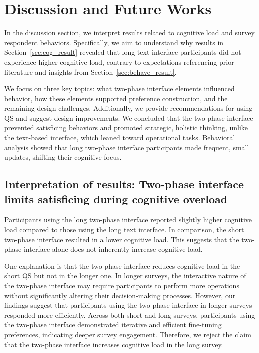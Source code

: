\section{Discussion and Future Works}
\label{sec:discussion}
In the discussion section, we interpret results related to cognitive load and survey respondent behaviors. Specifically, we aim to understand why results in Section~\ref{sec:cog_result} revealed that long text interface participants did not experience higher cognitive load, contrary to expectations referencing prior literature and insights from Section~\ref{sec:behave_result}.

We focus on three key topics: what two-phase interface elements influenced behavior, how these elements supported preference construction, and the remaining design challenges. Additionally, we provide recommendations for using QS and suggest design improvements. We concluded that the two-phase interface prevented satisficing behaviors and promoted strategic, holistic thinking, unlike the text-based interface, which leaned toward operational tasks. Behavioral analysis showed that long two-phase interface participants made frequent, small updates, shifting their cognitive focus.

\subsection{Interpretation of results: Two-phase interface limits satisficing during cognitive overload} \label{sec:satisficing}

Participants using the long two-phase interface reported slightly higher cognitive load compared to those using the long text interface. In comparison, the short two-phase interface resulted in a lower cognitive load. This suggests that the two-phase interface alone does not inherently increase cognitive load.

One explanation is that the two-phase interface reduces cognitive load in the short QS but not in the longer one. In longer surveys, the interactive nature of the two-phase interface may require participants to perform more operations without significantly altering their decision-making processes. However, our findings suggest that participants using the two-phase interface in longer surveys responded more efficiently. Across both short and long surveys, participants using the two-phase interface demonstrated iterative and efficient fine-tuning preferences, indicating deeper survey engagement. Therefore, we reject the claim that the two-phase interface increases cognitive load in the long survey.

